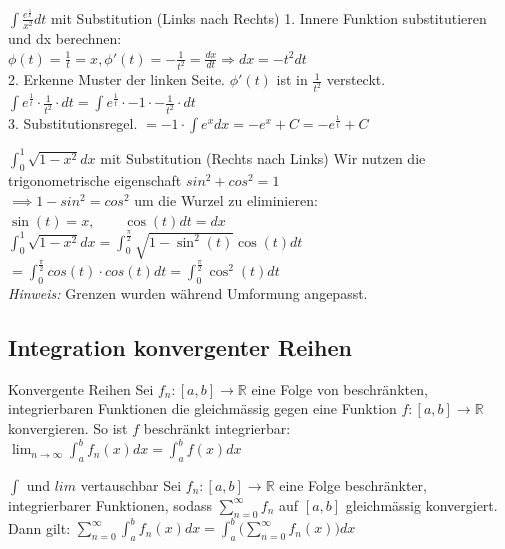 \documentclass[a4paper]{article}
\begin{document}
\begin{bspbox}{$\int \frac{e^{\frac{1}{x}}}{x^2}dt$ mit Substitution (Links nach Rechts)}
  1. Innere Funktion substitutieren und dx berechnen: \\
  $\phi(t) = \frac{1}{t} = x, \phi'(t) = -\frac{1}{t^2} = \frac{dx}{dt} \Rightarrow dx = -t^2dt$ \\
  2. Erkenne Muster der linken Seite. $\phi'(t)$ ist in $\frac{1}{t^2}$ versteckt. \\
  $\int e^{\frac{1}{t}} \cdot \frac{1}{t^2} \cdot dt = \int e^{\frac{1}{t}} \cdot -1 \cdot -\frac{1}{t^2} \cdot dt$ \\
  3. Substitutionsregel. $= -1 \cdot \int e^{x}dx = -e^x + C = -e^{\frac{1}{t}} + C$ \\
\end{bspbox}





\begin{bspbox}{$\int_0^1 \sqrt{1-x^2}dx$ mit Substitution (Rechts nach Links)}
  Wir nutzen die trigonometrische eigenschaft $sin^2 + cos^2 = 1$ \\ 
  $\implies 1-sin^2 = cos^2$ um die Wurzel zu eliminieren: \\
  $\sin(t) = x, \qquad \cos(t)dt = dx$ \\
  $\int_0^1 \sqrt{1-x^2}dx = \int_0^{\frac{\pi}{2}} \sqrt{1-\sin^2(t)} \cos(t)dt$ \\
  $ = \int_{0}^{\frac{\pi}{2}} cos(t) \cdot cos(t) dt = \int_0^{\frac{\pi}{2}} \cos^2(t)dt$ \\
  \textit{Hinweis:} Grenzen wurden während Umformung angepasst.
\end{bspbox}

\subsection{Integration konvergenter Reihen}
\begin{mainbox}{Konvergente Reihen}
  Sei $f_n : [a,b] \rightarrow \mathbb{R}$ eine Folge von beschränkten, integrierbaren Funktionen die gleichmässig gegen eine Funktion $f: [a,b] \rightarrow \mathbb{R}$ konvergieren. So ist $f$ beschränkt integrierbar:
  $\lim_{n \rightarrow \infty} \int_a^b f_n(x) dx = \int_a^b f(x) dx$
\end{mainbox}

\begin{subbox}{$\int$ und $lim$ vertauschbar}
  Sei $f_n : [a,b] \rightarrow \mathbb{R}$ eine Folge beschränkter, integrierbarer Funktionen, sodass $\sum_{n=0}^{\infty} f_n$ auf $[a,b]$ gleichmässig konvergiert. Dann gilt: $\sum_{n=0}^{\infty} \int_a^b f_n(x) dx = \int_a^b \Big( \sum_{n=0}^{\infty} f_n(x) \Big) dx$ \\
\end{subbox}
\end{document}
